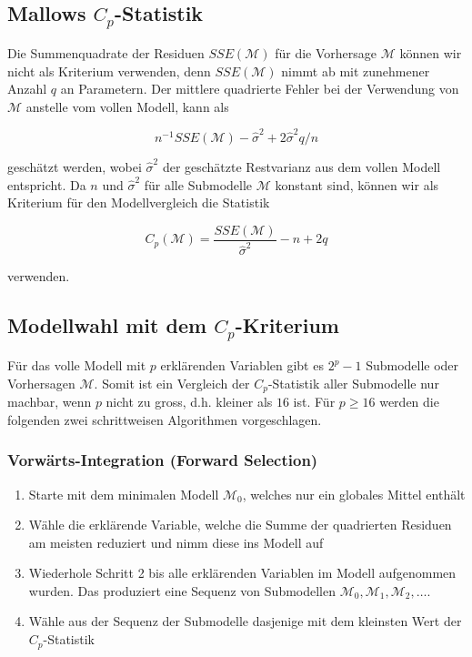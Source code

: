 \documentclass[]{book}
\providecommand{\tightlist}{%
  \setlength{\itemsep}{0pt}\setlength{\parskip}{0pt}}
\begin{document}
\subsection{\texorpdfstring{Mallows
\(C_p\)-Statistik}{Mallows C\_p-Statistik}}\label{mallows-c_p-statistik}

Die Summenquadrate der Residuen \(SSE(\mathcal{M})\) für die Vorhersage
\(\mathcal{M}\) können wir nicht als Kriterium verwenden, denn
\(SSE(\mathcal{M})\) nimmt ab mit zunehmener Anzahl \(q\) an Parametern.
Der mittlere quadrierte Fehler bei der Verwendung von \(\mathcal{M}\)
anstelle vom vollen Modell, kann als

\begin{equation}n^{-1} SSE(\mathcal{M}) - \hat{\sigma}^2 + 2\hat{\sigma}^2q/n\end{equation}

geschätzt werden, wobei \(\hat{\sigma}^2\) der geschätzte Restvarianz
aus dem vollen Modell entspricht. Da \(n\) und \(\hat{\sigma}^2\) für
alle Submodelle \(\mathcal{M}\) konstant sind, können wir als Kriterium
für den Modellvergleich die Statistik

\begin{equation}C_p(\mathcal{M}) = \frac{SSE(\mathcal{M})}{\hat{\sigma}^2} - n + 2q\end{equation}

verwenden.

\subsection{\texorpdfstring{Modellwahl mit dem
\(C_p\)-Kriterium}{Modellwahl mit dem C\_p-Kriterium}}\label{modellwahl-mit-dem-c_p-kriterium}

Für das volle Modell mit \(p\) erklärenden Variablen gibt es \(2^p-1\)
Submodelle oder Vorhersagen \(\mathcal{M}\). Somit ist ein Vergleich der
\(C_p\)-Statistik aller Submodelle nur machbar, wenn \(p\) nicht zu
gross, d.h. kleiner als \(16\) ist. Für \(p \ge 16\) werden die
folgenden zwei schrittweisen Algorithmen vorgeschlagen.

\subsubsection{Vorwärts-Integration (Forward
Selection)}\label{vorwarts-integration-forward-selection}

\begin{enumerate}
\def\labelenumi{\arabic{enumi}.}
\tightlist
\item
  Starte mit dem minimalen Modell \(\mathcal{M}_0\), welches nur ein
  globales Mittel enthält
\item
  Wähle die erklärende Variable, welche die Summe der quadrierten
  Residuen am meisten reduziert und nimm diese ins Modell auf
\item
  Wiederhole Schritt 2 bis alle erklärenden Variablen im Modell
  aufgenommen wurden. Das produziert eine Sequenz von Submodellen
  \(\mathcal{M}_0, \mathcal{M}_1, \mathcal{M}_2, \ldots\).
\item
  Wähle aus der Sequenz der Submodelle dasjenige mit dem kleinsten Wert
  der \(C_p\)-Statistik
\end{enumerate}
\end{document}
